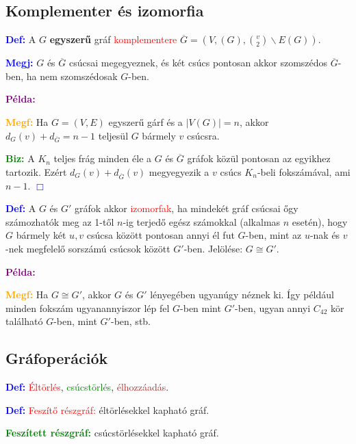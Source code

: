 \documentclass[../szamtud.tex]{subfiles}
\begin{document}
    \subsection{Komplementer és izomorfia}

        \textcolor{blue}{\textbf{Def:}}	A $G$ \textbf{egyszerű} gráf \textcolor{red}{komplementere} $\overline{G} = (V,(G), \binom{v}{2} \backslash E(G))$.

        \textcolor{blue}{\textbf{Megj:}} $G$ és $\overline{G}$ csúcsai megegyeznek, és két csúcs pontosan akkor szomszédos $\overline{G}$-ben, ha nem szomszédosak $G$-ben.

        \textcolor{purple}{\textbf{Példa:}}

        \textcolor{orange}{\textbf{Megf:}} Ha $G = (V,E)$ egyszerű gárf és a $|V(G)| = n$, akkor $d_G(v)+d_{\overline{G}}=n-1$ teljesül $G$ bármely $v$ csúcsra.

        \textcolor{green}{\textbf{Biz:}} A $K_n$ teljes frág minden éle a $G$ és $\overline{G}$ gráfok közül pontosan az egyikhez tartozik. Ezért $d_G (v) + d_{\overline{G}}(v)$ megyegyezik a $v$ csúcs $K_n$-beli fokszámával, ami $n-1$. \textcolor{blue}{$\Box$} 

        \textcolor{blue}{\textbf{Def:}} A $G$ és $G'$ gráfok akkor \textcolor{red}{izomorfak}, ha mindekét gráf csúcsai őgy számozhatók meg az 1-től $n$-ig terjedő egész számokkal (alkalmas $n$ esetén), hogy $G$ bármely két $u,v$ csúcsa között pontosan annyi él fut $G$-ben, mint az $u$-nak és $v$-nek megfelelő sorszámú csúcsok között $G'$-ben. Jelölése: $G \cong G'$.
        
        \textcolor{purple}{\textbf{Példa:}}

        \textcolor{orange}{\textbf{Megf:}} Ha $G \cong G'$, akkor $G$ és $G'$ lényegében ugyanúgy néznek ki. Így például minden fokszám ugyanannyiszor lép fel $G$-ben mint $G'$-ben, ugyan annyi $C_{42}$ kör található $G$-ben, mint $G'$-ben, stb.

    \subsection{Gráfoperációk}

        \textcolor{blue}{\textbf{Def:}} \textcolor{red}{Éltörlés}, \textcolor{green}{csúcstörlés}, \textcolor{brown}{élhozzáadás}.

        \textcolor{blue}{\textbf{Def:}} \textcolor{red}{Feszítő részgráf:} éltörlésekkel kapható gráf.

        \textcolor{green}{\textbf{Feszített részgráf:}} csúcstörlésekkel kapható gráf.
\end{document}
